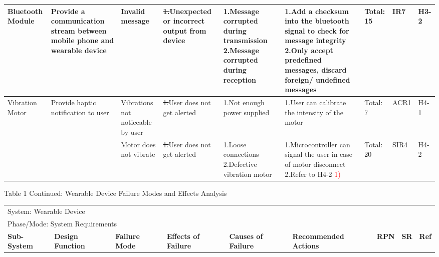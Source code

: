 \documentclass[12pt, titlepage]{article}
\begin{document}
\begin{landscape}
\begin{table}[H]
\begin{tabular}{| p{} | p{}  | p{} | p{} | p{} | p{} | p{} | p{} | p{} |}
        Bluetooth Module & Provide a communication stream between mobile phone and wearable device & Invalid message & \sout{1.}Unexpected or incorrect output from device & 1.Message corrupted during transmission \newline 2.Message corrupted during reception & 1.Add a checksum into the bluetooth signal to check for message integrity \newline 2.Only accept predefined messages, discard foreign/ undefined messages & Total: 15 & IR7 & H3-2 \\ \hline
         
        Vibration Motor & Provide haptic notification to user & Vibrations not noticeable by user & \sout{1.}User does not get alerted & 1.Not enough power supplied & 1.User can calibrate the intensity of the motor & Total: 7 & ACR1 & H4-1 \\ \cline{3-9}
    
         & & Motor does not vibrate & \sout{1.}User does not get alerted & 1.Loose connections \newline 2.Defective vibration motor  & 1.Microcontroller can signal the user in case of motor disconnect \newline 2.Refer to  H4-2 \textcolor{red}{1)} & Total: 20 & SIR4 & H4-2 \\ \cline{1-9}
     
        \end{tabular}

\end{table}

\begin{table}[H]
    \centering
        Table 1 Continued: Wearable Device Failure Modes and Effects Analysis

        \begin{tabular}{| p{} | p{}  | p{} | p{} | p{} | p{} | p{} | p{} | p{} |}
            \hline
        
        \multicolumn{9}{|l|}{System: Wearable Device} \\
        \multicolumn{9}{|l|}{Phase/Mode: System Requirements} \\ \hline
        \textbf{Sub-System} & \textbf{Design Function} & \textbf{Failure Mode} & \textbf{Effects of Failure} & \textbf{Causes of Failure} & \textbf{Recommended Actions} & \textbf{RPN} & \textbf{SR} & \textbf{Ref} \\ \hline
         

\end{tabular}
\end{table}
\end{landscape}
\end{document}
